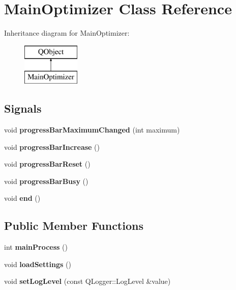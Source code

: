 \hypertarget{class_main_optimizer}{}\section{Main\+Optimizer Class Reference}
\label{class_main_optimizer}
Inheritance diagram for Main\+Optimizer\+:\begin{figure}[H]
\begin{center}
\leavevmode
\includegraphics[height=2.000000cm]{class_main_optimizer}
\end{center}
\end{figure}
\subsection*{Signals}
\begin{DoxyCompactItemize}
\item 
\mbox{\label{class_main_optimizer_ab8107fe245abd7f052dc3683cb7108a0}} 
void {\bfseries progress\+Bar\+Maximum\+Changed} (int maximum)
\item 
\mbox{\label{class_main_optimizer_a68066fdcf16c113fd360779a8c579f5f}} 
void {\bfseries progress\+Bar\+Increase} ()
\item 
\mbox{\label{class_main_optimizer_a8cc5851f85ba8fb9ebc3da51c96b3c38}} 
void {\bfseries progress\+Bar\+Reset} ()
\item 
\mbox{\label{class_main_optimizer_a2870e6e4c65fab899ab4dc33499f0c85}} 
void {\bfseries progress\+Bar\+Busy} ()
\item 
\mbox{\label{class_main_optimizer_a1b94c16a35a5a7c466c47467b9fa2f53}} 
void {\bfseries end} ()
\end{DoxyCompactItemize}
\subsection*{Public Member Functions}
\begin{DoxyCompactItemize}
\item 
\mbox{\label{class_main_optimizer_a4e0f30cf65c3cf5157d6372eab677f19}} 
int {\bfseries main\+Process} ()
\item 
\mbox{\label{class_main_optimizer_af14c69ecb39a4b1d54ee0edc62c72170}} 
void {\bfseries load\+Settings} ()
\item 
\mbox{\label{class_main_optimizer_a16f82dfc9ccd835e7909e6bdfb23a379}} 
void {\bfseries set\+Log\+Level} (const Q\+Logger\+::\+Log\+Level \&value)
\end{DoxyCompactItemize}
